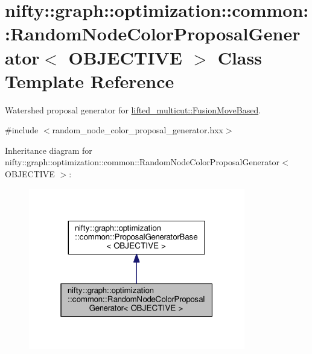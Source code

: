 \hypertarget{classnifty_1_1graph_1_1optimization_1_1common_1_1RandomNodeColorProposalGenerator}{}\section{nifty\+:\+:graph\+:\+:optimization\+:\+:common\+:\+:Random\+Node\+Color\+Proposal\+Generator$<$ O\+B\+J\+E\+C\+T\+I\+V\+E $>$ Class Template Reference}
\label{classnifty_1_1graph_1_1optimization_1_1common_1_1RandomNodeColorProposalGenerator}


Watershed proposal generator for \hyperlink{classnifty_1_1graph_1_1optimization_1_1lifted__multicut_1_1FusionMoveBased}{lifted\+\_\+multicut\+::\+Fusion\+Move\+Based}.  




{\ttfamily \#include $<$random\+\_\+node\+\_\+color\+\_\+proposal\+\_\+generator.\+hxx$>$}



Inheritance diagram for nifty\+:\+:graph\+:\+:optimization\+:\+:common\+:\+:Random\+Node\+Color\+Proposal\+Generator$<$ O\+B\+J\+E\+C\+T\+I\+V\+E $>$\+:\nopagebreak
\begin{figure}[H]
\begin{center}
\leavevmode
\includegraphics[width=268pt]{classnifty_1_1graph_1_1optimization_1_1common_1_1RandomNodeColorProposalGenerator__inherit__graph}
\end{center}
\end{figure}


